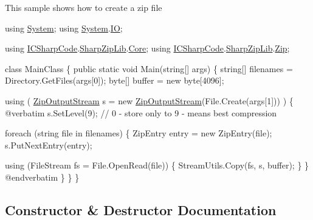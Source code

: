 This sample shows how to create a zip file 
\begin{DoxyCode}
\textcolor{keyword}{using} \hyperlink{namespace_system}{System};
\textcolor{keyword}{using} \hyperlink{namespace_system}{System}.\hyperlink{namespace_system_1_1_i_o}{IO};

\textcolor{keyword}{using} \hyperlink{namespace_i_c_sharp_code}{ICSharpCode}.\hyperlink{namespace_i_c_sharp_code_1_1_sharp_zip_lib}{SharpZipLib}.\hyperlink{namespace_i_c_sharp_code_1_1_sharp_zip_lib_1_1_core}{Core};
\textcolor{keyword}{using} \hyperlink{namespace_i_c_sharp_code}{ICSharpCode}.\hyperlink{namespace_i_c_sharp_code_1_1_sharp_zip_lib}{SharpZipLib}.\hyperlink{namespace_i_c_sharp_code_1_1_sharp_zip_lib_1_1_zip}{Zip};

\textcolor{keyword}{class }MainClass
\{
    \textcolor{keyword}{public} \textcolor{keyword}{static} \textcolor{keywordtype}{void} Main(\textcolor{keywordtype}{string}[] args)
    \{
        \textcolor{keywordtype}{string}[] filenames = Directory.GetFiles(args[0]);
        byte[] buffer = \textcolor{keyword}{new} byte[4096];

        \textcolor{keyword}{using} ( \hyperlink{class_i_c_sharp_code_1_1_sharp_zip_lib_1_1_zip_1_1_zip_output_stream_a19fba03baf9f8523b17358da692fe8a6}{ZipOutputStream} s = \textcolor{keyword}{new} \hyperlink{class_i_c_sharp_code_1_1_sharp_zip_lib_1_1_zip_1_1_zip_output_stream_a19fba03baf9f8523b17358da692fe8a6}{ZipOutputStream}(File.Create(args[1]))
       ) \{
@verbatim
s.SetLevel(9); \textcolor{comment}{// 0 - store only to 9 - means best compression}

\textcolor{keywordflow}{foreach} (\textcolor{keywordtype}{string} file \textcolor{keywordflow}{in} filenames) \{
    ZipEntry entry = \textcolor{keyword}{new} ZipEntry(file);
    s.PutNextEntry(entry);

    \textcolor{keyword}{using} (FileStream fs = File.OpenRead(file)) \{
        StreamUtils.Copy(fs, s, buffer);
    \}
\}
\textcolor{keyword}{@end}verbatim
        \}
    \}
\}   
\end{DoxyCode}
 

\subsection{Constructor \& Destructor Documentation}
\mbox{\label{class_i_c_sharp_code_1_1_sharp_zip_lib_1_1_zip_1_1_zip_output_stream_a19fba03baf9f8523b17358da692fe8a6}} 
